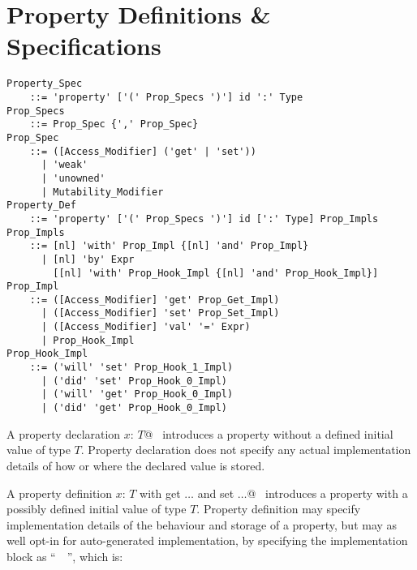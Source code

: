 \section{Property Definitions \& Specifications}
\label{sec:property-def}

\grammar\begin{lstlisting}[deletekeywords={of,up,to}]
Property_Spec
    ::= 'property' ['(' Prop_Specs ')'] id ':' Type
Prop_Specs 
    ::= Prop_Spec {',' Prop_Spec}
Prop_Spec 
    ::= ([Access_Modifier] ('get' | 'set')) 
      | 'weak'
      | 'unowned'
      | Mutability_Modifier
Property_Def
    ::= 'property' ['(' Prop_Specs ')'] id [':' Type] Prop_Impls
Prop_Impls 
    ::= [nl] 'with' Prop_Impl {[nl] 'and' Prop_Impl}
      | [nl] 'by' Expr 
        [[nl] 'with' Prop_Hook_Impl {[nl] 'and' Prop_Hook_Impl}]
Prop_Impl 
    ::= ([Access_Modifier] 'get' Prop_Get_Impl)
      | ([Access_Modifier] 'set' Prop_Set_Impl)
      | ([Access_Modifier] 'val' '=' Expr)
      | Prop_Hook_Impl
Prop_Hook_Impl
    ::= ('will' 'set' Prop_Hook_1_Impl)
      | ('did' 'set' Prop_Hook_0_Impl)
      | ('will' 'get' Prop_Hook_0_Impl)
      | ('did' 'get' Prop_Hook_0_Impl)
\end{lstlisting}

A property declaration \lstinline@property $x$: $T$@~ introduces a property without a defined initial value of type $T$. Property declaration does not specify any actual implementation details of how or where the declared value is stored.

A property definition \lstinline@property $x$: $T$ with get $\ldots$ and set $\ldots$@~ introduces a property with a possibly defined initial value of type $T$. Property definition may specify implementation details of the behaviour and storage of a property, but may as well opt-in for auto-generated implementation, by specifying the implementation block as ``~\code{_}~'', which is: 

